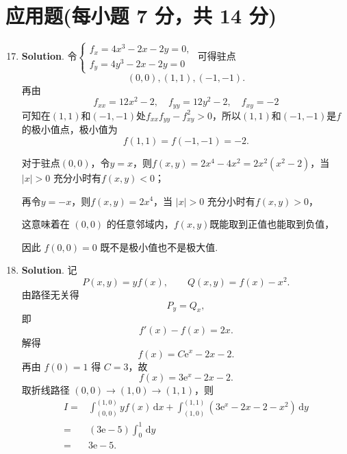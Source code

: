 \documentclass[../main.tex]{subfiles}
\begin{document}
\section{应用题(每小题 7 分，共 14 分)}
\begin{enumerate}
    \setcounter{enumi}{16}
    \item \textbf{Solution}. 令$\begin{cases}
                  f_x=4x^3-2x-2y=0, \\
                  f_y=4y^3-2x-2y=0
              \end{cases}$ 可得驻点
          \[
              (0,0),(1,1),(-1,-1).
          \]
          再由
          \[
              f_{xx}=12x^2-2,\quad f_{yy}=12y^2-2,\quad f_{xy}=-2
          \]
          可知在$(1,1)$和$(-1,-1)$处$f_{xx}f_{yy}-f_{xy}^2>0$，所以$(1,1)$和$(-1,-1)$是$f$的极小值点，极小值为
          \[
              f(1,1)=f(-1,-1)=-2.
          \]

          对于驻点$(0,0)$，令$y=x$，则$f(x,y)=2x^4-4x^2=2x^2(x^2-2)$，当 \(|x|>0\) 充分小时有$f(x,y)<0$；

          再令$y=-x$，则$f(x,y)=2x^4$，当 \(|x|>0\) 充分小时有$f(x,y)>0$，

          这意味着在 $(0,0)$ 的任意邻域内，$f(x,y)$既能取到正值也能取到负值，

          因此 $f(0,0)=0$ 既不是极小值也不是极大值.

    \item \textbf{Solution}. 记
          \[
              P(x,y)=yf(x),\qquad Q(x,y)=f(x)-x^2.
          \]
          由路径无关得
          \[
              P_y=Q_x,
          \]
          即
          \[
              f'(x)-f(x)=2x.
          \]
          解得
          \[
              f(x)=C\mathrm{e}^x-2x-2.
          \]
          再由 \(f(0)=1\) 得 \(C=3\)，故
          \[
              f(x)=3\mathrm{e}^x-2x-2.
          \]
          取折线路径 \((0,0)\to(1,0)\to(1,1)\)，则
          \[
              \begin{aligned}
                  I = {} & \int_{(0,0)}^{(1,0)} yf(x)\,\mathrm{d}x + \int_{(1,0)}^{(1,1)} \left(3\mathrm{e}^x-2x-2-x^2\right)\,\mathrm{d}y \\
                  = {}   & (3\mathrm{e}-5)\int_0^1 \,\mathrm{d}y                                                                           \\
                  = {}   & 3\mathrm{e}-5.
              \end{aligned}
          \]

\end{enumerate}
\end{document}
